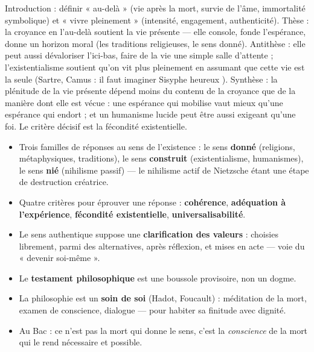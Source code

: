 \documentclass[11pt]{article}
\begin{document}
\begin{corrige}
Introduction : définir « au-delà » (vie après la mort, survie de l'âme, immortalité symbolique) et « vivre pleinement » (intensité, engagement, authenticité). Thèse : la croyance en l'au-delà soutient la vie présente — elle console, fonde l'espérance, donne un horizon moral (les traditions religieuses, le sens donné). Antithèse : elle peut aussi dévaloriser l'ici-bas, faire de la vie une simple salle d'attente ; l'existentialisme soutient qu'on vit plus pleinement en assumant que cette vie est la seule (Sartre, Camus : \guillemotleft il faut imaginer Sisyphe heureux \guillemotright). Synthèse : la plénitude de la vie présente dépend moins du contenu de la croyance que de la manière dont elle est vécue : une espérance qui mobilise vaut mieux qu'une espérance qui endort ; et un humanisme lucide peut être aussi exigeant qu'une foi. Le critère décisif est la fécondité existentielle.
\end{corrige}

\begin{aretenir}
\begin{itemize}
  \item Trois familles de réponses au sens de l'existence : le sens \textbf{donné} (religions, métaphysiques, traditions), le sens \textbf{construit} (existentialisme, humanismes), le sens \textbf{nié} (nihilisme passif) — le nihilisme actif de Nietzsche étant une étape de destruction créatrice.
  \item Quatre critères pour éprouver une réponse : \textbf{cohérence}, \textbf{adéquation à l'expérience}, \textbf{fécondité existentielle}, \textbf{universalisabilité}.
  \item Le sens authentique suppose une \textbf{clarification des valeurs} : choisies librement, parmi des alternatives, après réflexion, et mises en acte — voie du « devenir soi-même ».
  \item Le \textbf{testament philosophique} est une boussole provisoire, non un dogme.
  \item La philosophie est un \textbf{soin de soi} (Hadot, Foucault) : méditation de la mort, examen de conscience, dialogue — pour habiter sa finitude avec dignité.
  \item Au Bac : ce n'est pas la mort qui donne le sens, c'est la \emph{conscience} de la mort qui le rend nécessaire et possible.
\end{itemize}
\end{aretenir}
\end{document}
